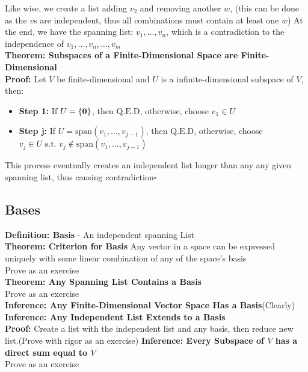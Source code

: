 \documentclass{article}
\newcommand{\st}{\mbox{ s.t. }}
\newcommand{\qed}{\mbox{Q.E.D}}
\newcommand{\0}{{\bf{0}}}
\newcommand{\spa}{\mbox{span}}
\begin{document}
Like wise, we create a list adding $v_2$ and removing another $w$, (this can be done as the $v$s are independent, thus all combinations must contain at least one $w$)
At the end, we have the spanning list: $v_1,\dots,v_n$, which is a contradiction to the independence of $v_1,\dots,v_n,\dots,v_m$\\
\textbf{Theorem: Subspaces of a Finite-Dimensional Space are Finite-Dimensional}\\
\textbf{Proof:}
Let $V$ be finite-dimensional and $U$ is a infinite-dimensional subspace of $V$, then:
\begin{itemize}
    \item \textbf{Step 1:} If $U=\{\0\}$, then $\qed$, otherwise, choose $v_1\in U$\
    \item \textbf{Step j:} If $U=\spa(v_1,\dots,v_{j-1})$, then $\qed$, otherwise, choose $v_j\in U\st v_j\notin\spa(v_1,\dots,v_{j-1})$
\end{itemize}
This process eventually creates an independent list longer than any any given spanning list, thus causing contradiction\quad$\square$
\subsection{Bases}
\textbf{Definition: Basis} - An independent spanning List\\
\textbf{Theorem: Criterion for Basis}
Any vector in a space can be expressed uniquely with some linear combination of any of the space's basis\\
\null\hfill{Prove as an exercise}\\
\textbf{Theorem: Any Spanning List Contains a Basis}\\
\null\hfill{Prove as an exercise}\\
\textbf{Inference: Any Finite-Dimensional Vector Space Has a Basis}\quad(Clearly)\\
\textbf{Inference: Any Independent List Extends to a Basis}\\
\textbf{Proof:}
Create a list with the independent list and any basis, then reduce new list.\quad(Prove with rigor as an exercise)
\textbf{Inference: Every Subspace of $V$ has a direct sum equal to $V$}\\
\null\hfill{Prove as an exercise}
\end{document}
